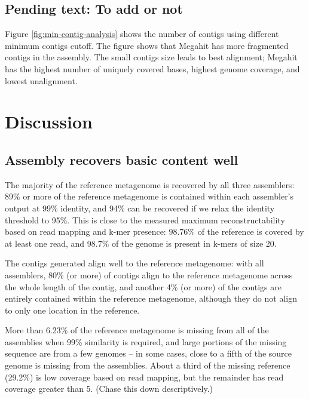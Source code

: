 \documentclass[10pt,a4paper,twocolumn]{article}
\begin{document}

\subsection*{Pending text: To add or not}
Figure \ref{fig:min-contig-analysis} shows the number of contigs using
different minimum contigs cutoff.  The figure shows that Megahit
\cite{megahit} has more fragmented contigs in the assembly. The small
contigs size leads to best alignment; Megahit has the highest number
of uniquely covered bases, highest genome coverage, and lowest
unalignment.

\section*{Discussion}
\subsection*{Assembly recovers basic content well}

The majority of the reference metagenome is recovered by all three
assemblers: 89\% or more of the reference metagenome is contained
within each assembler’s output at 99\% identity, and 94\% can be
recovered if we relax the identity threshold to 95\%.  This is close
to the measured maximum reconstructability based on read mapping and
k-mer presence: 98.76\% of the reference is covered by at least one
read, and 98.7\% of the genome is present in k-mers of size 20.

The contigs generated align well to the reference metagenome: with all assemblers, 80\% (or
more) of contigs align to the reference metagenome across the whole
length of the contig, and another 4\% (or more) of the contigs are
entirely contained within the reference metagenome, although they do
not align to only one location in the reference.

 
More than 6.23\% of the reference metagenome is missing from all of
the assemblies when 99\% similarity is required, and large portions of
the missing sequence are from a few genomes -- in some cases, close to
a fifth of the source genome is missing from the assemblies.
About a third of the missing reference (29.2\%) is low coverage based on
read mapping, but the remainder has read coverage greater than 5.
(Chase this down descriptively.)
\end{document}
